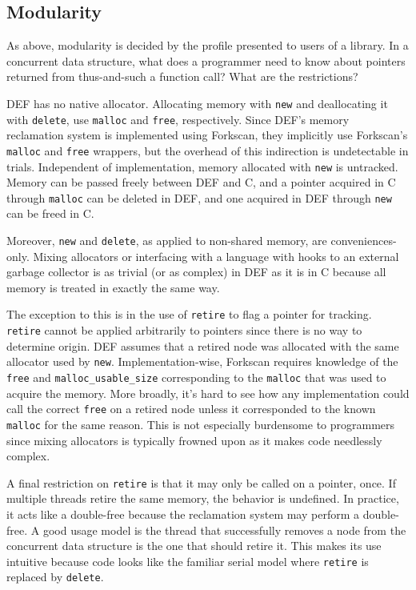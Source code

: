 \subsection{Modularity}

As above, modularity is decided by the profile presented to users of a library.  In a concurrent data structure, what does a programmer need to know about pointers returned from thus-and-such a function call?  What are the restrictions?

DEF has no native allocator.  Allocating memory with \texttt{new} and deallocating it with \texttt{delete}, use \texttt{malloc} and \texttt{free}, respectively.  Since DEF's memory reclamation system is implemented using Forkscan, they implicitly use Forkscan's \texttt{malloc} and \texttt{free} wrappers, but the overhead of this indirection is undetectable in trials.  Independent of implementation, memory allocated with \texttt{new} is untracked.  Memory can be passed freely between DEF and C, and a pointer acquired in C through \texttt{malloc} can be deleted in DEF, and one acquired in DEF through \texttt{new} can be freed in C.

Moreover, \texttt{new} and \texttt{delete}, as applied to non-shared memory, are conveniences-only.  Mixing allocators or interfacing with a language with hooks to an external garbage collector is as trivial (or as complex) in DEF as it is in C because all memory is treated in exactly the same way.

The exception to this is in the use of \texttt{retire} to flag a pointer for tracking.  \texttt{retire} cannot be applied arbitrarily to pointers since there is no way to determine origin.  DEF assumes that a retired node was allocated with the same allocator used by \texttt{new}.  Implementation-wise, Forkscan requires knowledge of the \texttt{free} and \texttt{malloc\_{}usable\_{}size} corresponding to the \texttt{malloc} that was used to acquire the memory.  More broadly, it's hard to see how any implementation could call the correct \texttt{free} on a retired node unless it corresponded to the known \texttt{malloc} for the same reason.  This is not especially burdensome to programmers since mixing allocators is typically frowned upon as it makes code needlessly complex.

A final restriction on \texttt{retire} is that it may only be called on a pointer, once.  If multiple threads retire the same memory, the behavior is undefined.  In practice, it acts like a double-free because the reclamation system may perform a double-free.  A good usage model is the thread that successfully removes a node from the concurrent data structure is the one that should retire it.  This makes its use intuitive because code looks like the familiar serial model where \texttt{retire} is replaced by \texttt{delete}.

